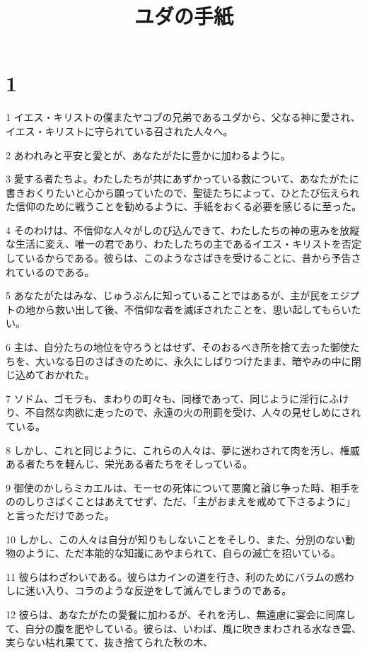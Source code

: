 

\title{ユダの手紙}


\chapter{1}

\par 1 イエス・キリストの僕またヤコブの兄弟であるユダから、父なる神に愛され、イエス・キリストに守られている召された人々へ。
\par 2 あわれみと平安と愛とが、あなたがたに豊かに加わるように。
\par 3 愛する者たちよ。わたしたちが共にあずかっている救について、あなたがたに書きおくりたいと心から願っていたので、聖徒たちによって、ひとたび伝えられた信仰のために戦うことを勧めるように、手紙をおくる必要を感じるに至った。
\par 4 そのわけは、不信仰な人々がしのび込んできて、わたしたちの神の恵みを放縦な生活に変え、唯一の君であり、わたしたちの主であるイエス・キリストを否定しているからである。彼らは、このようなさばきを受けることに、昔から予告されているのである。
\par 5 あなたがたはみな、じゅうぶんに知っていることではあるが、主が民をエジプトの地から救い出して後、不信仰な者を滅ぼされたことを、思い起してもらいたい。
\par 6 主は、自分たちの地位を守ろうとはせず、そのおるべき所を捨て去った御使たちを、大いなる日のさばきのために、永久にしばりつけたまま、暗やみの中に閉じ込めておかれた。
\par 7 ソドム、ゴモラも、まわりの町々も、同様であって、同じように淫行にふけり、不自然な肉欲に走ったので、永遠の火の刑罰を受け、人々の見せしめにされている。
\par 8 しかし、これと同じように、これらの人々は、夢に迷わされて肉を汚し、権威ある者たちを軽んじ、栄光ある者たちをそしっている。
\par 9 御使のかしらミカエルは、モーセの死体について悪魔と論じ争った時、相手をののしりさばくことはあえてせず、ただ、「主がおまえを戒めて下さるように」と言っただけであった。
\par 10 しかし、この人々は自分が知りもしないことをそしり、また、分別のない動物のように、ただ本能的な知識にあやまられて、自らの滅亡を招いている。
\par 11 彼らはわざわいである。彼らはカインの道を行き、利のためにバラムの惑わしに迷い入り、コラのような反逆をして滅んでしまうのである。
\par 12 彼らは、あなたがたの愛餐に加わるが、それを汚し、無遠慮に宴会に同席して、自分の腹を肥やしている。彼らは、いわば、風に吹きまわされる水なき雲、実らない枯れ果てて、抜き捨てられた秋の木、
